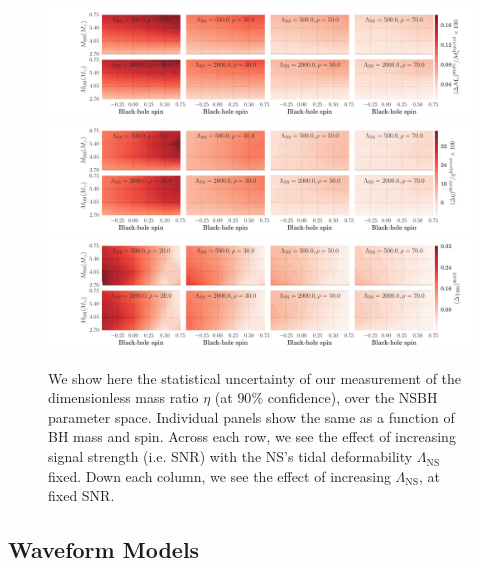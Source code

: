 \documentclass[aps,prd,amsmath,floats,floatfix, twocolumn,
superscriptaddress,nofootinbib,showpacs]{revtex4-1}
\newcommand{\lambdans}{\Lambda_\mathrm{NS}}
\begin{document}
\begin{figure}
\centering 
\includegraphics[trim = {2cm 0 0 0},width=2.1\columnwidth]{plots/TNMchirpCIWidths90_0_Lambda_SNR}\\
\includegraphics[trim = {2cm 0 0 0},width=2.1\columnwidth]{plots/TNEtaCIWidths90_0_Lambda_SNR}\\
\includegraphics[trim = {2cm 0 0 0},width=2.1\columnwidth]{plots/TNChiBHCIWidths90_0_Lambda_SNR}
\caption{
We show here the statistical uncertainty of our measurement of the 
dimensionless mass ratio $\eta$ (at $90\%$ confidence), over the NSBH
parameter space.
Individual panels show the same as a function of BH mass and spin.
Across each row, we see the effect of increasing signal strength (i.e.
SNR) with the NS's tidal deformability $\lambdans$ fixed. Down each
column, we see the effect of increasing $\lambdans$, at fixed SNR.
}
\label{fig:CIWidths90_Lambda_SNR}
\end{figure}

\subsection{Waveform Models}\label{s2:waveforms}
\end{document}
